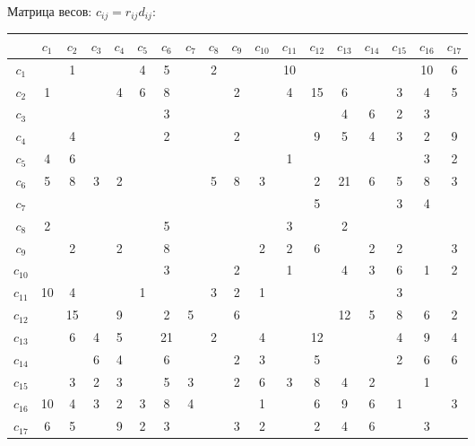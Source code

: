 \documentclass[12pt, a4paper] {ncc}
\begin{document}
Матрица весов: $c_{ij} = r_{ij} d_{ij}$: \\
\begin{tabular}{|c|c|c|c|c|c|c|c|c|c|c|c|c|c|c|c|c|c|}
\hline
      & $c_{1}$ & $c_{2}$ & $c_{3}$ & $c_{4}$ & $c_{5}$ & $c_{6}$ & $c_{7}$ & $c_{8}$ & $c_{9}$ & $c_{10}$ & $c_{11}$ & $c_{12}$ & $c_{13}$ & $c_{14}$ & $c_{15}$ & $c_{16}$ & $c_{17}$ \\
\hline
$c_{1}$   &   & 1 &   &   & 4 & 5 &   & 2 &   &   & 10 &   &   &   &   & 10 & 6 \\ \hline
$c_{2}$   & 1 &   &   & 4 & 6 & 8 &   &   & 2 &   & 4 & 15 & 6 &   & 3 & 4 & 5 \\ \hline
$c_{3}$   &   &   &   &   &   & 3 &   &   &   &   &   &   & 4 & 6 & 2 & 3 &   \\ \hline
$c_{4}$   &   & 4 &   &   &   & 2 &   &   & 2 &   &   & 9 & 5 & 4 & 3 & 2 & 9 \\ \hline
$c_{5}$   & 4 & 6 &   &   &   &   &   &   &   &   & 1 &   &   &   &   & 3 & 2 \\ \hline
$c_{6}$   & 5 & 8 & 3 & 2 &   &   &   & 5 & 8 & 3 &   & 2 & 21 & 6 & 5 & 8 & 3 \\ \hline
$c_{7}$   &   &   &   &   &   &   &   &   &   &   &   & 5 &   &   & 3 & 4 &   \\ \hline
$c_{8}$   & 2 &   &   &   &   & 5 &   &   &   &   & 3 &   & 2 &   &   &   &   \\ \hline
$c_{9}$   &   & 2 &   & 2 &   & 8 &   &   &   & 2 & 2 & 6 &   & 2 & 2 &   & 3 \\ \hline
$c_{10}$  &   &   &   &   &   & 3 &   &   & 2 &   & 1 &   & 4 & 3 & 6 & 1 & 2 \\ \hline
$c_{11}$  & 10 & 4 &   &   & 1 &   &   & 3 & 2 & 1 &   &   &   &   & 3 &   &   \\ \hline
$c_{12}$  &   & 15 &   & 9 &   & 2 & 5 &   & 6 &   &   &   & 12 & 5 & 8 & 6 & 2 \\ \hline
$c_{13}$  &   & 6 & 4 & 5 &   & 21 &   & 2 &   & 4 &   & 12 &   &   & 4 & 9 & 4 \\ \hline
$c_{14}$  &   &   & 6 & 4 &   & 6 &   &   & 2 & 3 &   & 5 &   &   & 2 & 6 & 6 \\ \hline
$c_{15}$  &   & 3 & 2 & 3 &   & 5 & 3 &   & 2 & 6 & 3 & 8 & 4 & 2 &   & 1 &   \\ \hline
$c_{16}$  & 10 & 4 & 3 & 2 & 3 & 8 & 4 &   &   & 1 &   & 6 & 9 & 6 & 1 &   & 3 \\ \hline
$c_{17}$  & 6 & 5 &   & 9 & 2 & 3 &   &   & 3 & 2 &   & 2 & 4 & 6 &   & 3 &   \\ \hline
\end{tabular}
\end{document}
